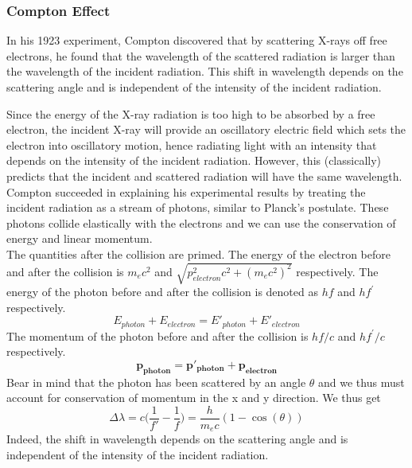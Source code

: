 \documentclass[a4paper]{article}
\begin{document}
\subsubsection*{Compton Effect}
\begin{defi}
In his 1923 experiment, Compton discovered that by scattering X-rays off free electrons, he found that the wavelength of the scattered radiation is larger than the wavelength of the incident radiation. This shift in wavelength depends on the scattering angle and is independent of the intensity of the incident radiation.
\end{defi}
\begin{Note}
Since the energy of the X-ray radiation is too high to be absorbed by a free electron, the incident X-ray will provide an oscillatory electric field which sets the electron into oscillatory motion, hence radiating light with an intensity that depends on the intensity of the incident radiation. However, this (classically) predicts that the incident and scattered radiation will have the same wavelength.\\[5pt]
Compton succeeded in explaining his experimental results by treating the incident radiation as a stream of photons, similar to Planck's postulate. These photons collide elastically with the electrons and we can use the conservation of energy and linear momentum.\\[5pt]
The quantities after the collision are primed. The energy of the electron before and after the collision is $m_ec^2$ and $\sqrt{p_{electron}^2c^2+(m_ec^2)^2}$ respectively. The energy of the photon before and after the collision is denoted as $hf$ and $hf^\prime$ respectively.
$$E_{photon}+E_{electron}=E'_{photon}+E'_{electron}$$
The momentum of the photon before and after the collision is $hf/c$ and $hf^\prime/c$ respectively.
$$\mathbf{p_{photon}=p'_{photon}+p_{electron}}$$
Bear in mind that the photon has been scattered by an angle $\theta$ and we thus must account for conservation of momentum in the x and y direction. We thus get
$$\Delta\lambda=c\bigg(\frac{1}{f'}-\frac{1}{f}\bigg)=\frac{h}{m_ec}(1-\cos(\theta))$$
Indeed, the shift in wavelength depends on the scattering angle and is independent of the intensity of the incident radiation.
\end{Note}
\end{document}
